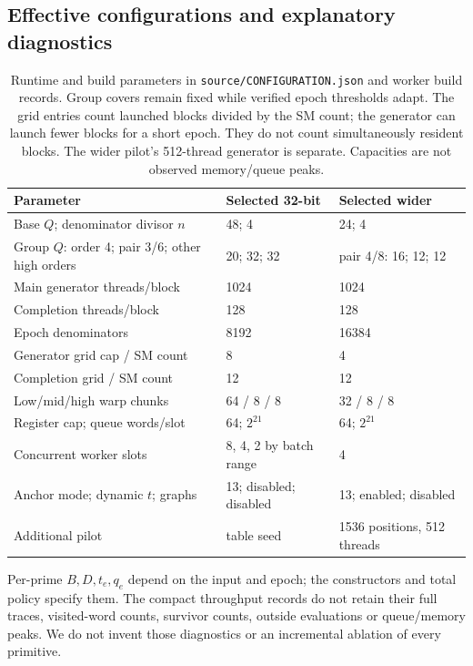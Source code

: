 \documentclass[11pt]{article}
\theoremstyle{definition}\newtheorem{remark}[theorem]{Remark}
\begin{document}
\subsection{Effective configurations and explanatory diagnostics}\label{sec:params}
\begin{table}[ht]
\centering\small
\begin{tabular}{P{.37\textwidth}P{.25\textwidth}P{.25\textwidth}}
\toprule Parameter & Selected 32-bit & Selected wider\\\midrule
Base $Q$; denominator divisor $n$ & 48; 4 & 24; 4\\
Group $Q$: order 4; pair 3/6; other high orders & 20; 32; 32 & pair 4/8: 16; 12; 12\\
Main generator threads/block & 1024 & 1024\\
Completion threads/block & 128 & 128\\
Epoch denominators & 8192 & 16384\\
Generator grid cap / SM count & 8 & 4\\
Completion grid / SM count & 12 & 12\\
Low/mid/high warp chunks & 64 / 8 / 8 & 32 / 8 / 8\\
Register cap; queue words/slot & 64; $2^{21}$ & 64; $2^{21}$\\
Concurrent worker slots & 8, 4, 2 by batch range & 4\\
Anchor mode; dynamic $t$; graphs & 13; disabled; disabled & 13; enabled; disabled\\
Additional pilot & table seed & 1536 positions, 512 threads\\
\bottomrule
\end{tabular}
\caption{Runtime and build parameters in \texttt{source/CONFIGURATION.json}
and worker build records. Group covers remain fixed while verified epoch
thresholds adapt. The grid entries count launched blocks divided by the
SM count; the generator can launch fewer blocks for a short epoch. They
do not count simultaneously resident blocks. The wider pilot's 512-thread
generator is separate. Capacities are not observed memory/queue peaks.}
\end{table}
Per-prime $B,D,t_e,q_e$ depend on the input and epoch; the constructors
and total policy specify them. The compact throughput records do not
retain their full traces, visited-word counts, survivor counts, outside
evaluations or queue/memory peaks. We do not invent those diagnostics or
an incremental ablation of every primitive.
\end{document}
